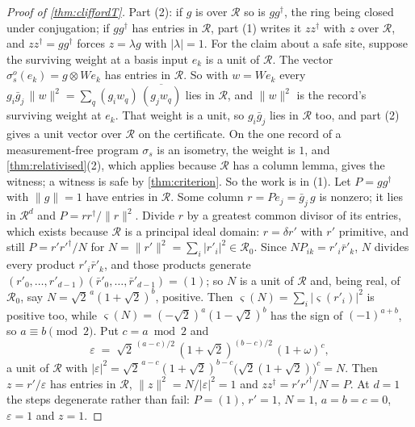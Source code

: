 \documentclass[acmsmall,screen,review,anonymous,nonacm]{acmart}
\begin{document}
\begin{proof}[Proof of \cref{thm:cliffordT}]
Part (2): if $g$ is over $\mathcal R$ so is $gg^{\dagger}$, the ring
being closed under conjugation; if $gg^{\dagger}$ has entries in $\mathcal R$,
part (1) writes it $zz^{\dagger}$ with $z$ over $\mathcal R$, and $zz^{\dagger} =
gg^{\dagger}$ forces $z = \lambda g$ with $|\lambda| = 1$.
For the claim about a safe site, suppose the surviving weight at
a basis input $e_k$ is a unit of $\mathcal R$. The vector
$\sigma^{o}_s(e_k) = g \otimes We_k$ has entries in $\mathcal R$. So with $w =
We_k$ every $g_i\bar g_j\,\lVert w\rVert^{2} = \sum_q (g_i w_q)\,\overline{(g_j
w_q)}$ lies in $\mathcal R$, and $\lVert w\rVert^{2}$ is the record's surviving
weight at $e_k$. That weight is a unit, so $g_i\bar g_j$ lies in $\mathcal R$
too, and part (2) gives a unit vector over $\mathcal R$ on the certificate.
On the one
record of a measurement-free program $\sigma_s$ is an isometry, the weight is
$1$, and \cref{thm:relativised}(2), which applies because $\mathcal R$ has a
column lemma, gives the witness; a witness is safe by \cref{thm:criterion}.
So the work is in (1). Let
$P = gg^{\dagger}$ with $\lVert g\rVert = 1$ have entries in $\mathcal R$.
Some column $r = Pe_j = \bar g_j\,g$ is nonzero; it lies in $\mathcal R^{d}$
and $P = rr^{\dagger}/\lVert r\rVert^{2}$. Divide $r$ by a greatest common
divisor of its entries, which exists because $\mathcal R$ is a principal
ideal domain: $r = \delta r'$ with $r'$ primitive, and still
$P = r'r'^{\dagger}/N$ for $N = \lVert r'\rVert^{2} = \sum_i |r'_i|^{2} \in
\mathcal R_0$. Since $NP_{ik} = r'_i\bar r'_k$, $N$ divides every product
$r'_i \bar r'_k$, and those products generate
$(r'_0, \ldots, r'_{d-1})(\bar r'_0, \ldots, \bar r'_{d-1}) = (1)$; so $N$ is
a unit of $\mathcal R$ and, being real, of $\mathcal R_0$, say
$N = \sqrt2^{\,a}(1+\sqrt2)^{b}$, positive. Then
$\varsigma(N) = \sum_i |\varsigma(r'_i)|^{2}$ is positive too, while
$\varsigma(N) = (-\sqrt2)^{a}(1-\sqrt2)^{b}$ has the sign of $(-1)^{a+b}$, so
$a \equiv b \pmod 2$. Put $c = a \bmod 2$ and
\[
  \varepsilon \;=\; \sqrt2^{\,(a-c)/2}\,(1+\sqrt2)^{(b-c)/2}\,(1+\omega)^{c} ,
\]
a unit of $\mathcal R$ with $|\varepsilon|^{2} =
\sqrt2^{\,a-c}(1+\sqrt2)^{b-c}\bigl(\sqrt2(1+\sqrt2)\bigr)^{c} = N$. Then
$z = r'/\varepsilon$ has entries in $\mathcal R$,
$\lVert z\rVert^{2} = N/|\varepsilon|^{2} = 1$ and
$zz^{\dagger} = r'r'^{\dagger}/N = P$. At $d = 1$ the steps degenerate rather
than fail: $P = (1)$, $r' = 1$, $N = 1$, $a = b = c = 0$, $\varepsilon = 1$
and $z = 1$.
\end{proof}
\end{document}
